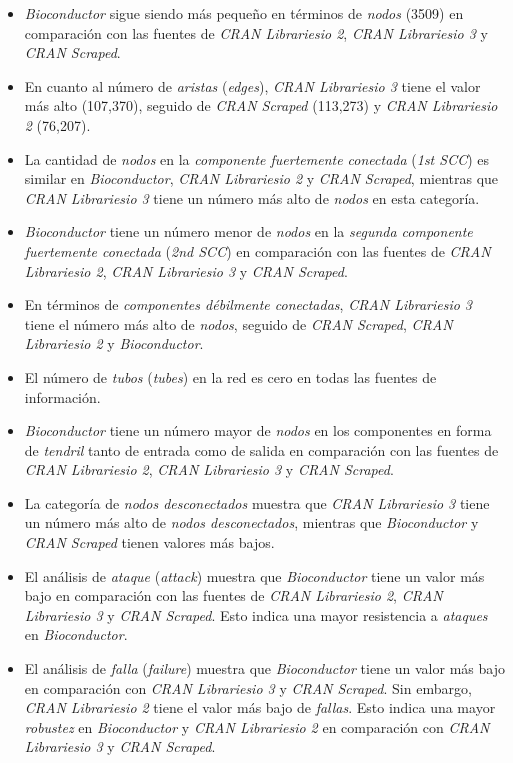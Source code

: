 \begin{itemize}
    \item \textit{Bioconductor} sigue siendo más pequeño en términos de \textit{nodos} (3509)
          en comparación con las fuentes de \textit{CRAN Librariesio 2}, \textit{CRAN Librariesio 3}
          y \textit{CRAN Scraped}.
    \item En cuanto al número de \textit{aristas} (\textit{edges}), \textit{CRAN Librariesio 3}
          tiene el valor más alto (107,370), seguido de \textit{CRAN Scraped} (113,273) y
          \textit{CRAN Librariesio 2} (76,207).
    \item La cantidad de \textit{nodos} en la \textit{componente fuertemente conectada}
          (\textit{1st SCC}) es similar en \textit{Bioconductor}, \textit{CRAN Librariesio 2} y
          \textit{CRAN Scraped}, mientras que \textit{CRAN Librariesio 3} tiene un número más alto
          de \textit{nodos} en esta categoría.
    \item \textit{Bioconductor} tiene un número menor de \textit{nodos} en la
          \textit{segunda componente fuertemente conectada} (\textit{2nd SCC}) en comparación con
          las fuentes de \textit{CRAN Librariesio 2}, \textit{CRAN Librariesio 3} y
          \textit{CRAN Scraped}.
    \item En términos de \textit{componentes débilmente conectadas},
          \textit{CRAN Librariesio 3} tiene el número más alto de \textit{nodos}, seguido
          de \textit{CRAN Scraped}, \textit{CRAN Librariesio 2} y \textit{Bioconductor}.
    \item El número de \textit{tubos} (\textit{tubes}) en la red es cero en todas las fuentes
          de información.
    \item \textit{Bioconductor} tiene un número mayor de \textit{nodos} en los componentes en
          forma de \textit{tendril} tanto de entrada como de salida en comparación con las fuentes
          de \textit{CRAN Librariesio 2}, \textit{CRAN Librariesio 3} y \textit{CRAN Scraped}.
    \item La categoría de \textit{nodos desconectados} muestra que \textit{CRAN Librariesio 3} tiene
          un número más alto de \textit{nodos desconectados}, mientras que \textit{Bioconductor} y
          \textit{CRAN Scraped} tienen valores más bajos.
    \item El análisis de \textit{ataque} (\textit{attack}) muestra que \textit{Bioconductor} tiene
          un valor más bajo en comparación con las fuentes de \textit{CRAN Librariesio 2}, \textit{CRAN Librariesio 3}
          y \textit{CRAN Scraped}. Esto indica una mayor resistencia a \textit{ataques} en \textit{Bioconductor}.
    \item El análisis de \textit{falla} (\textit{failure}) muestra que \textit{Bioconductor} tiene un
          valor más bajo en comparación con \textit{CRAN Librariesio 3} y \textit{CRAN Scraped}.
          Sin embargo, \textit{CRAN Librariesio 2} tiene el valor más bajo de \textit{fallas}. Esto indica
          una mayor \textit{robustez} en \textit{Bioconductor} y \textit{CRAN Librariesio 2} en
          comparación con \textit{CRAN Librariesio 3} y \textit{CRAN Scraped}.
\end{itemize}

